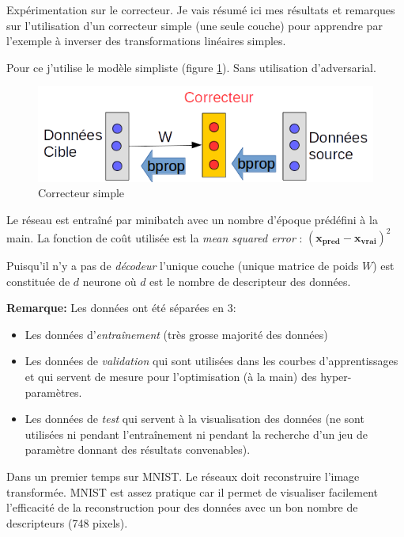 

Expérimentation sur le correcteur. Je vais résumé ici mes résultats et remarques
sur l'utilisation d'un correcteur simple (une seule couche) pour apprendre par l'exemple
à inverser des transformations linéaires simples.

Pour ce j'utilise le modèle simpliste (figure \ref{fig:correcteur}). 
Sans utilisation d'adversarial.

\begin{figure}[H]
\centering
\includegraphics[width=0.45\linewidth]{fig/05-04-2016/Correcteur.png}
\caption{Correcteur simple}
\label{fig:correcteur}
\end{figure}

Le réseau est entraîné par minibatch avec un nombre d'époque prédéfini à la main.
La fonction de coût utilisée est la \emph{mean squared error} : $(\pmb{x_{pred}}-\pmb{x_{vrai}})^2$

Puisqu'il n'y a pas de \emph{décodeur} l'unique couche (unique matrice de poids $W$)
est constituée de $d$ neurone où $d$ est le nombre de descripteur des données.

\textbf{Remarque:} Les données ont été séparées en 3:
\begin{itemize}
	\item Les données d'\emph{entraînement} (très grosse majorité des données)
	\item Les données de \emph{validation} qui sont utilisées dans les courbes 
	d'apprentissages et qui servent de mesure pour l'optimisation (à la main) des 
	hyper-paramètres.
	\item Les données de \emph{test} qui servent à la visualisation des données (ne 
	sont utilisées ni pendant l'entraînement ni pendant la recherche d'un jeu de paramètre 
	donnant des résultats convenables).
\end{itemize}



Dans un premier temps sur MNIST.
Le réseaux doit reconstruire l'image transformée.
MNIST est assez pratique car il permet de visualiser facilement l'efficacité 
de la reconstruction pour des données avec un bon nombre de descripteurs (748 pixels).


